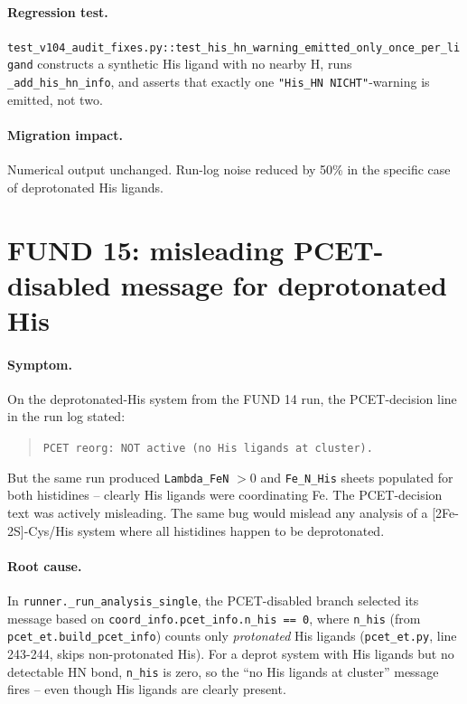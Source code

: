 \documentclass[10pt,a4paper,twoside]{article}
\newcommand{\fn}[1]{\texttt{#1}}
\begin{document}
\paragraph{Regression test.}
\fn{test\_v104\_audit\_fixes.py::test\_his\_hn\_warning\_emitted\_only\_once\_per\_ligand}
constructs a synthetic His ligand with no nearby H, runs
\fn{\_add\_his\_hn\_info}, and asserts that exactly one
\texttt{"His\_HN NICHT"}-warning is emitted, not two.

\paragraph{Migration impact.}
Numerical output unchanged. Run-log noise reduced by 50\% in the
specific case of deprotonated His ligands.

\section{FUND 15: misleading PCET-disabled message for deprotonated His}
\label{sec:fund-15}

\paragraph{Symptom.}
On the deprotonated-His system from the FUND 14 run, the
PCET-decision line in the run log stated:
\begin{quote}
\texttt{PCET reorg: NOT active (no His ligands at cluster).}
\end{quote}
But the same run produced \texttt{Lambda\_FeN} $> 0$ and
\texttt{Fe\_N\_His} sheets populated for both histidines --
clearly His ligands were coordinating Fe. The PCET-decision
text was actively misleading. The same bug would mislead any
analysis of a [2Fe-2S]-Cys/His system where all histidines
happen to be deprotonated.

\paragraph{Root cause.}
In \fn{runner.\_run\_analysis\_single}, the PCET-disabled branch
selected its message based on
\fn{coord\_info.pcet\_info.n\_his == 0}, where \fn{n\_his} (from
\fn{pcet\_et.build\_pcet\_info}) counts only \emph{protonated} His
ligands (\fn{pcet\_et.py}, line 243-244, skips non-protonated
His). For a deprot system with His ligands but no detectable HN
bond, \fn{n\_his} is zero, so the ``no His ligands at cluster''
message fires -- even though His ligands are clearly present.
\end{document}
